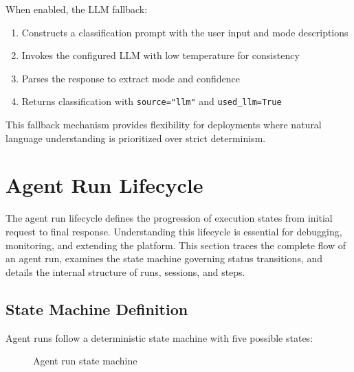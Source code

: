 \documentclass[a4paper,twoside]{sapthesis}
\begin{document}
When enabled, the LLM fallback:
\begin{enumerate}
    \item Constructs a classification prompt with the user input and mode descriptions
    \item Invokes the configured LLM with low temperature for consistency
    \item Parses the response to extract mode and confidence
    \item Returns classification with \texttt{source="llm"} and \texttt{used\_llm=True}
\end{enumerate}

This fallback mechanism provides flexibility for deployments where natural language understanding is prioritized over strict determinism.

\section{Agent Run Lifecycle}
\label{sec:agent-run-lifecycle}

The agent run lifecycle defines the progression of execution states from initial request to final response. Understanding this lifecycle is essential for debugging, monitoring, and extending the platform. This section traces the complete flow of an agent run, examines the state machine governing status transitions, and details the internal structure of runs, sessions, and steps.

\subsection{State Machine Definition}

Agent runs follow a deterministic state machine with five possible states:

\begin{figure}[htbp]
\centering
{}
\caption{Agent run state machine}
\label{fig:run-state-machine}
\end{figure}
\end{document}
